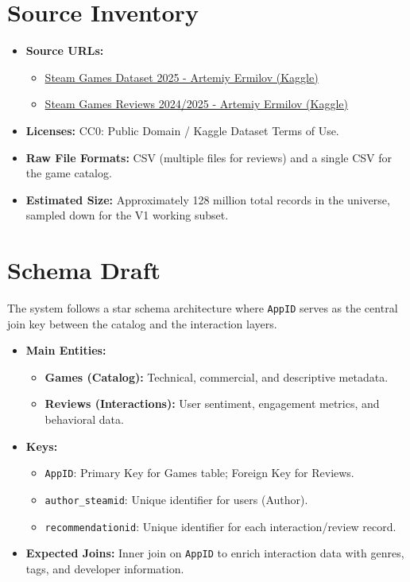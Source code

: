 \documentclass[11pt,a4paper]{article}
\begin{document}
\section{Source Inventory}
\begin{itemize}[leftmargin=*]
  \item \textbf{Source URLs:}
  \begin{itemize}[leftmargin=*]
    \item \href{https://www.kaggle.com/datasets/artermiloff/steam-games-dataset}{Steam Games Dataset 2025 - Artemiy Ermilov (Kaggle)}
    \item \href{https://www.kaggle.com/datasets/artermiloff/steam-games-reviews-2024}{Steam Games Reviews 2024/2025 - Artemiy Ermilov (Kaggle)}
  \end{itemize}
  \item \textbf{Licenses:} CC0: Public Domain / Kaggle Dataset Terms of Use.
  \item \textbf{Raw File Formats:} CSV (multiple files for reviews) and a single CSV for the game catalog.
  \item \textbf{Estimated Size:} Approximately 128 million total records in the universe, sampled down for the V1 working subset.
\end{itemize}

\section{Schema Draft}
The system follows a star schema architecture where \texttt{AppID} serves as the central join key between the catalog and the interaction layers.

\begin{itemize}[leftmargin=*]
  \item \textbf{Main Entities:}
  \begin{itemize}[leftmargin=*]
    \item \textbf{Games (Catalog):} Technical, commercial, and descriptive metadata.
    \item \textbf{Reviews (Interactions):} User sentiment, engagement metrics, and behavioral data.
  \end{itemize}
  \item \textbf{Keys:}
  \begin{itemize}[leftmargin=*]
    \item \texttt{AppID}: Primary Key for Games table; Foreign Key for Reviews.
    \item \texttt{author\_steamid}: Unique identifier for users (Author).
    \item \texttt{recommendationid}: Unique identifier for each interaction/review record.
  \end{itemize}
  \item \textbf{Expected Joins:} Inner join on \texttt{AppID} to enrich interaction data with genres, tags, and developer information.
\end{itemize}
\end{document}
